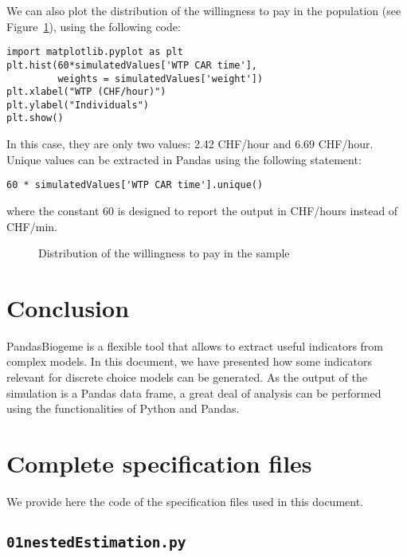 \documentclass[12pt,a4paper]{article}
\begin{document}
We can also plot the distribution of the willingness to pay in the
population (see Figure~\ref{fig:wtp}), using the following code:
\begin{lstlisting}
import matplotlib.pyplot as plt
plt.hist(60*simulatedValues['WTP CAR time'],
         weights = simulatedValues['weight'])
plt.xlabel("WTP (CHF/hour)")
plt.ylabel("Individuals")
plt.show()
\end{lstlisting}
In this case, they are only two values: 2.42 CHF/hour and 6.69
CHF/hour. Unique values can be extracted in Pandas using the following
statement:
\begin{lstlisting}
60 * simulatedValues['WTP CAR time'].unique()
\end{lstlisting}
where the constant 60 is designed to report the output in CHF/hours
instead of CHF/min.
\begin{figure}[htb]
\begin{center}
\end{center}
\caption{\label{fig:wtp}Distribution of the willingness to pay in the sample}
\end{figure}
\section{Conclusion}

PandasBiogeme is a flexible tool that allows to extract useful
indicators from complex models. In this document, we have presented
how some indicators relevant for discrete choice models  can be
generated. As the output of the simulation is a Pandas data frame, a
great deal of analysis can be performed using the functionalities of
Python and Pandas. 

\clearpage

\appendix

\section{Complete specification files}

We provide here the code of the specification files used in this
document. 

\subsection{\lstinline$01nestedEstimation.py$}
\label{sec:01nestedEstimation}
\end{document}
